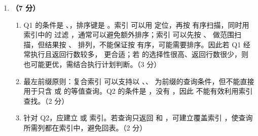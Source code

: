 \documentclass[a4paper,11pt]{article}
\begin{document}
\begin{enumerate}[start=21, label=\textbf{\arabic*.}, leftmargin=2.4em, itemsep=0.45em]
\item \textbf{（7 分）}
\begin{enumerate}[label=（\arabic*）, leftmargin=2.2em, itemsep=2pt]
  \item Q1 的条件是 、，排序键是 。索引  可以用  定位，再按  有序扫描，同时用索引中的  过滤 ，通常可以避免额外排序；索引  可以先按 、 做范围扫描，但结果按 、 排列，不能保证按  有序，可能需要排序。因此若 Q1 经常执行且返回行数较多， 更合适；若  的选择性很高、返回行数很少，则  也可能更优，需结合执行计划判断。\hfill（3 分）
  \item 最左前缀原则：复合索引  可以支持以 、、 为前缀的查询条件，但不能直接用于只含  或  的等值查询。Q2 的条件是 ，没有 ，因此  不能有效利用索引查找。\hfill（2 分）
  \item 针对 Q2，应建立  或  索引。若查询只返回  和 ，可建立覆盖索引 ，使查询所需列都在索引中，避免回表。\hfill（2 分）
\end{enumerate}

\end{enumerate}

\end{document}
